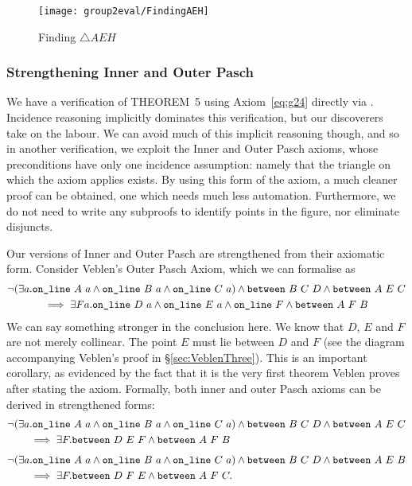 \begin{figure}
\centering\texttt{[image: group2eval/FindingAEH]}
\caption{Finding $\triangle AEH$}
\label{fig:FindingAEH}
\end{figure}

\subsubsection{Strengthening Inner and Outer Pasch}
We have a verification of THEOREM~5 using Axiom~\ref{eq:g24} directly via . Incidence reasoning implicitly dominates this verification, but our discoverers take on the labour. We can avoid much of this implicit reasoning though, and so in another verification, we exploit the Inner and Outer Pasch axioms, whose preconditions have only one incidence assumption: namely that the triangle on which the axiom applies exists. By using this form of the axiom, a much cleaner proof can be obtained, one which needs much less automation. Furthermore, we do not need to write any subproofs to identify points in the figure, nor eliminate disjuncts.

Our versions of Inner and Outer Pasch are strengthened from their axiomatic form. Consider Veblen's Outer Pasch Axiom, which we can formalise as
\begin{multline*}
  \neg(\exists a.\texttt{on\_line}\ A\ a\wedge \texttt{on\_line}\ B\ a\wedge \texttt{on\_line}\ C\ a) \wedge \texttt{between}\ B\ C\ D \wedge \texttt{between}\ A\ E\ C\\ \implies \exists F a.  \texttt{on\_line}\ D\ a \wedge \texttt{on\_line}\ E\ a \wedge \texttt{on\_line}\ F \wedge \texttt{between}\ A\ F\ B
\end{multline*}
We can say something stronger in the conclusion here. We know that $D$, $E$ and $F$ are not merely collinear. The point $E$ must lie between $D$ and $F$ (see the diagram accompanying Veblen's proof in \S\ref{sec:VeblenThree}). This is an important corollary, as evidenced by the fact that it is the very first theorem Veblen proves after stating the axiom. Formally, both inner and outer Pasch axioms can be derived in strengthened forms:
\begin{equation}\label{eq:OuterPasch}
  \begin{split}
    &\neg(\exists a.\texttt{on\_line}\ A\ a\wedge \texttt{on\_line}\ B\ a\wedge \texttt{on\_line}\ C\ a) \wedge \texttt{between}\ B\ C\ D \wedge \texttt{between}\ A\ E\ C\\ 
    &\qquad\implies \exists F. \texttt{between}\ D\ E\ F \wedge \texttt{between}\ A\ F\ B
  \end{split}
\end{equation}
\begin{equation}\label{eq:InnerPasch}
  \begin{split}
    &\neg(\exists a.\texttt{on\_line}\ A\ a\wedge \texttt{on\_line}\ B\ a\wedge \texttt{on\_line}\ C\ a) \wedge \texttt{between}\ B\ C\ D \wedge \texttt{between}\ A\ E\ B\\ 
    &\qquad\implies \exists F. \texttt{between}\ D\ F\ E \wedge \texttt{between}\ A\ F\ C.
  \end{split}
\end{equation}

